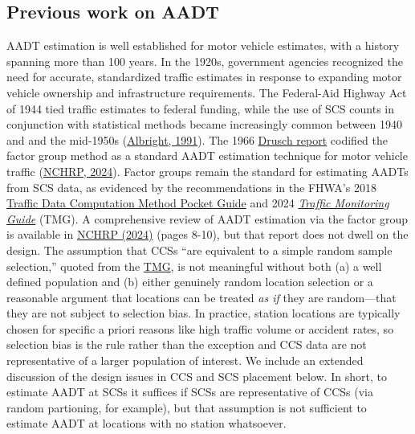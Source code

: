 \documentclass[11pt]{article}
\begin{document}
    \subsection{Previous work on AADT}\label{previous-work-on-aadt}

AADT estimation is well established for motor vehicle estimates, with a
history spanning more than 100 years. In the 1920s, government agencies
recognized the need for accurate, standardized traffic estimates in
response to expanding motor vehicle ownership and infrastructure
requirements. The Federal-Aid Highway Act of 1944 tied traffic estimates
to federal funding, while the use of SCS counts in conjunction with
statistical methods became increasingly common between 1940 and and the
mid-1950s (\href{https://trid.trb.org/View/365623}{Albright, 1991}). The
1966
\href{https://onlinepubs.trb.org/Onlinepubs/hrr/1966/118/118-005.pdf}{Drusch
report} codified the factor group method as a standard AADT estimation
technique for motor vehicle traffic
(\href{https://nap.nationalacademies.org/catalog/27925/guide-on-methods-for-assigning-counts-to-adjustment-factor-groups}{NCHRP,
2024}). Factor groups remain the standard for estimating AADTs from SCS
data, as evidenced by the recommendations in the FHWA's 2018
\href{https://www.fhwa.dot.gov/policyinformation/pubs/pl18027_traffic_data_pocket_guide.pdf}{Traffic
Data Computation Method Pocket Guide} and 2024
\href{https://www.fhwa.dot.gov/policyinformation/tmguide/}{\emph{Traffic
Monitoring Guide}} (TMG). A comprehensive review of AADT estimation via
the factor group is available in
\href{https://nap.nationalacademies.org/catalog/27925/guide-on-methods-for-assigning-counts-to-adjustment-factor-groups}{NCHRP
(2024)} (pages 8-10), but that report does not dwell on the design. The
assumption that CCSs ``are equivalent to a simple random sample
selection,'' quoted from the
\href{https://www.fhwa.dot.gov/policyinformation/tmguide/}{TMG}, is not
meaningful without both (a) a well defined population and (b) either
genuinely random location selection or a reasonable argument that
locations can be treated \emph{as if} they are random---that they are
not subject to selection bias. In practice, station locations are
typically chosen for specific a priori reasons like high traffic volume
or accident rates, so selection bias is the rule rather than the
exception and CCS data are not representative of a larger population of
interest. We include an extended discussion of the design issues in CCS
and SCS placement below. In short, to estimate AADT at SCSs it suffices
if SCSs are representative of CCSs (via random partioning, for example),
but that assumption is not sufficient to estimate AADT at locations with
no station whatsoever.
\end{document}
